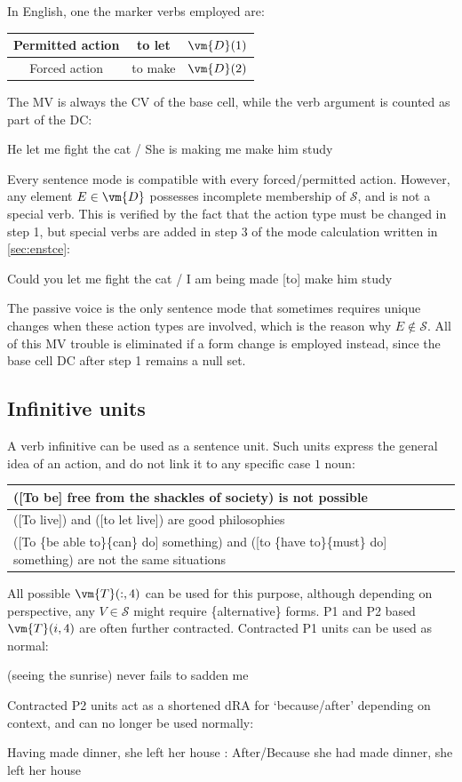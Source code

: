In English, one  the marker verbs employed are:
\begin{setdef}
    \begin{tabular}{c|c|c}
        Permitted action & to let & $\vm{D}(1)$\\\hline Forced action & to make & $\vm{D}(2)$
    \end{tabular}
\end{setdef}
The MV is always the CV of the base cell, while the verb argument is  counted as part of the DC:
\begin{example}
    He let me fight the cat / She is making me make him study
\end{example}
Every sentence mode is compatible with every forced/permitted action. However, any element $E\in\vm{D}$ possesses incomplete membership of $\mathcal{S}$, and is not a special verb. This is  verified by the fact that the action type must be changed in step 1, but special verbs are added in step 3 of the mode calculation written in \autoref{sec:enstce}:
\begin{example}
        Could you let me fight the cat / I am being made [to] make him study
\end{example}
The passive voice is the only  sentence mode that sometimes requires unique changes when these action types are involved, which is  the reason why $E\notin\mathcal{S}$. All of this MV trouble is eliminated if a form change is employed instead, since the base cell DC after step 1 remains a null set.
\subsection{Infinitive units}
A verb infinitive  can be used as a sentence unit. Such units express the general idea of an action, and do not link it to any specific  case $1$ noun:
\begin{example}
    \begin{tabular}{m{14cm}}
        ([To be] free from the shackles of society) is not possible\\\hline
        ([To live]) and ([to let live]) are good philosophies\\\hline
        ([To \{be able to\}\{can\} do] something) and ([to \{have to\}\{must\} do] something) are not the same situations
    \end{tabular}
\end{example}
All possible $\vm{T}(:,4)$ can be used for this purpose, although depending on perspective, any $V\in\mathcal{S}$ might require \{alternative\} forms. P1 and P2 based  $\vm{T}(i,4)$ are often  further contracted. Contracted P1  units can be used as normal:
\begin{example}
    [to be] (seeing the sunrise) never fails to sadden me
\end{example}
Contracted P2 units  act as a shortened dRA for `because/after' depending on context, and can no longer be used normally:
\begin{example}
    Having made dinner, she left her house : After/Because she had made dinner, she left her house
\end{example}
